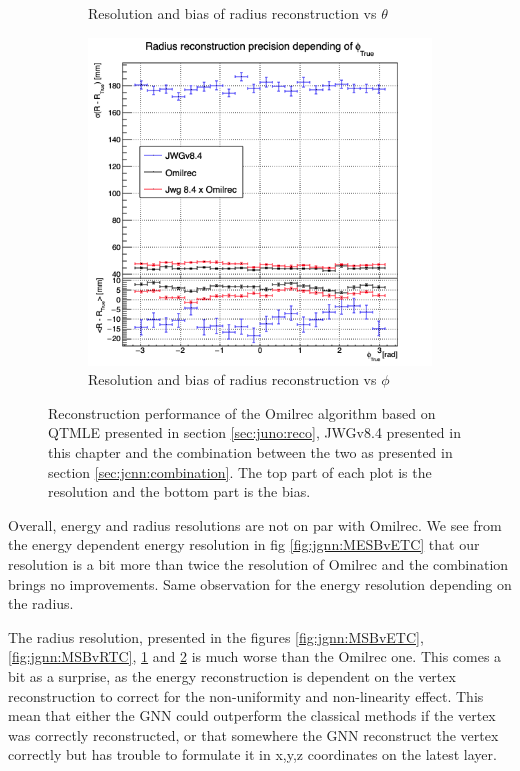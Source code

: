 \documentclass[../main.tex]{subfiles}
\begin{document}
\begin{figure}[ht]
\begin{subfigure}[t]{0.32\linewidth}
    \caption{Resolution and bias of radius reconstruction vs $\theta$}
    \label{fig:jgnn:MSBvTTC}
  \end{subfigure}
  \begin{subfigure}[t]{0.32\linewidth}
    \centering
    \includegraphics[width=\linewidth]{images/jgnn/MSBvPT.png}
    \caption{Resolution and bias of radius reconstruction vs $\phi$}
    \label{fig:jgnn:MSBvPTC}
  \end{subfigure}
  \caption{Reconstruction performance of the Omilrec algorithm based on QTMLE presented in section \ref{sec:juno:reco}, JWGv8.4 presented in this chapter and the combination between the two as presented in section \ref{sec:jcnn:combination}. The top part of each plot is the resolution and the bottom part is the bias.}
  \label{fig:jgnn:results}
\end{figure}

Overall, energy and radius resolutions are not on par with Omilrec. We see from the energy dependent energy resolution in fig \ref{fig:jgnn:MESBvETC} that our resolution is a bit more than twice the resolution of Omilrec and the combination brings no improvements. Same observation for the energy resolution depending on the radius.

The radius resolution, presented in the figures \ref{fig:jgnn:MSBvETC}, \ref{fig:jgnn:MSBvRTC}, \ref{fig:jgnn:MSBvTTC} and \ref{fig:jgnn:MSBvPTC} is much worse than the Omilrec one. This comes a bit as a surprise, as the energy reconstruction is dependent on the vertex reconstruction to correct for the non-uniformity and non-linearity effect. This mean that either the GNN could outperform the classical methods if the vertex was correctly reconstructed, or that somewhere the GNN reconstruct the vertex correctly but has trouble to formulate it in x,y,z coordinates on the latest layer.
\end{document}
